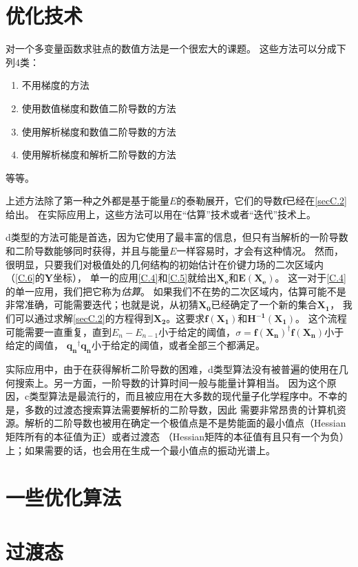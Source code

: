 \section{优化技术}
对一个多变量函数求驻点的数值方法是一个很宏大的课题。
这些方法可以分成下列4类：
\begin{enumerate}
	\item[(a) ] 不用梯度的方法
	\item[(b) ] 使用数值梯度和数值二阶导数的方法
	\item[(c) ] 使用解析梯度和数值二阶导数的方法
	\item[(d) ] 使用解析梯度和解析二阶导数的方法
\end{enumerate}
等等。

上述方法除了第一种之外都是基于能量$E$的泰勒展开，它们的导数$\mathbf{f}$已经在\autoref{secC.2}给出。
在实际应用上，这些方法可以用在“估算”技术或者“迭代”技术上。

d类型的方法可能是首选，因为它使用了最丰富的信息，但只有当解析的一阶导数和二阶导数能够同时获得，并且与能量$E$一样容易时，才会有这种情况。
然而，很明显，只要我们对极值处的几何结构的初始估计在价键力场的二次区域内（\autoref{C.6}的$\mathbf{Y}$坐标），
单一的应用\autoref{C.4}和\autoref{C.5}就给出$\mathbf{X_e}$和$\mathbf{E(X_e)}$。
这一对于\autoref{C.4}的单一应用，我们把它称为\textit{估算}。
如果我们不在势的二次区域内，估算可能不是非常准确，可能需要迭代；也就是说，从初猜$\mathbf{X_0}$已经确定了一个新的集合$\mathbf{X_1}$，
我们可以通过求解\autoref{secC.2}的方程得到$\mathbf{X_2}$。这要求$\mathbf{f(X_1)}$和$\mathbf{H^{-1}(X_1)}$。
这个流程可能需要一直重复，直到$E_n-E_{n-1}$小于给定的阈值，$\sigma =\mathbf{f(X_n)}^{\dagger}\mathbf{f(X_n)}$小于给定的阈值，
$\mathbf{q_n}^{\dagger}\mathbf{q_n}$小于给定的阈值，或者全部三个都满足。

实际应用中，由于在获得解析二阶导数的困难，d类型算法没有被普遍的使用在几何搜索上。另一方面，一阶导数的计算时间一般与能量计算相当。
因为这个原因，c类型算法是最流行的，而且被应用在大多数的现代量子化学程序中。不幸的是，多数的过渡态搜索算法需要解析的二阶导数，因此
需要非常昂贵的计算机资源。解析的二阶导数也被用在确定一个极值点是不是势能面的最小值点（Hessian矩阵所有的本征值为正）或者过渡态
（Hessian矩阵的本征值有且只有一个为负）上；如果需要的话，也会用在生成一个最小值点的振动光谱上。

\section{一些优化算法}
\section{过渡态}
